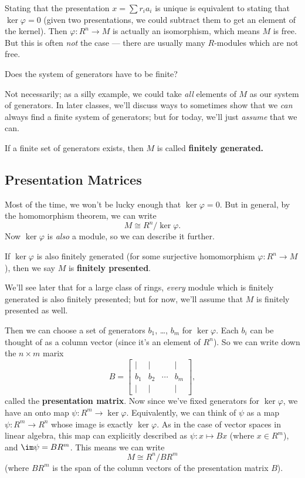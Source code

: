 Stating that the presentation $x = \sum r_ia_i$ is unique is equivalent to stating that $\ker \varphi = 0$ (given two presentations, we could subtract them to get an element of the kernel). Then $\varphi : R^n \to M$ is actually an isomorphism, which means $M$ is free. But this is often \emph{not} the case --- there are usually many $R$-modules which are not free. 

\begin{question}
Does the system of generators have to be finite?
\end{question}

\begin{ans}
Not necessarily; as a silly example, we could take \emph{all} elements of $M$ as our system of generators. In later classes, we'll discuss ways to sometimes show that we \emph{can} always find a finite system of generators; but for today, we'll just \emph{assume} that we can. 
\end{ans}

\begin{definition}
If a finite set of generators exists, then $M$ is called \textbf{finitely generated.} 
\end{definition}

\subsection{Presentation Matrices}

Most of the time, we won't be lucky enough that $\ker \varphi = 0$. But in general, by the homomorphism theorem, we can write \[M \cong R^n/\ker \varphi.\] Now $\ker \varphi$ is \emph{also} a module, so we can describe it further. 

\begin{definition}
If $\ker \varphi$ is also finitely generated (for some surjective homomorphism $\varphi : R^n \to M$), then we say $M$ is \textbf{finitely presented}. 
\end{definition}

We'll see later that for a large class of rings, \emph{every} module which is finitely generated is also finitely presented; but for now, we'll assume that $M$ is finitely presented as well. 

Then we can choose a set of generators $b_1$, \ldots, $b_m$ for $\ker \varphi$. Each $b_i$ can be thought of as a column vector (since it's an element of $R^n$). So we can write down the $n \times m$ marix \[B = \begin{bmatrix} \vert & \vert &  & \vert \\ b_1 & b_2 & \cdots & b_m \\ \vert & \vert & & \vert \end{bmatrix},\] called the \textbf{presentation matrix}. Now since we've fixed generators for $\ker \varphi$, we have an onto map $\psi : R^m \to \ker \varphi$. Equivalently, we can think of $\psi$ as a map $\psi : R^m \to R^n$ whose image is exactly $\ker \varphi$. As in the case of vector spaces in linear algebra, this map can explicitly described as $\psi : x \mapsto Bx$ (where $x \in R^m$), and $\im \psi = BR^m$. This means we can write \[M \cong R^n/BR^m\] (where $BR^m$ is the span of the column vectors of the presentation matrix $B$). 

